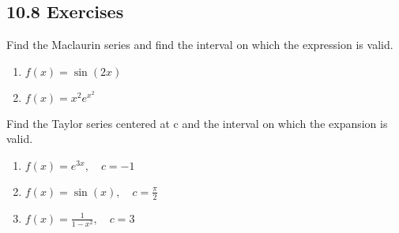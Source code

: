 \subsection{10.8 Exercises}

Find the Maclaurin series and find the interval on which the expression is
valid.
\begin{enumerate}[itemsep=24em]
  \item \(\displaystyle  f(x) = \sin(2x) \)
  \item \(\displaystyle  f(x) = x^2e^{x^{2} } \)
\end{enumerate}

\newpage %

Find the Taylor series centered at c and the interval on which the expansion is
valid.
\begin{enumerate}[itemsep=18em, resume]
  \item \(\displaystyle  f(x) = e^{3x}, \quad c = -1 \)
  \item \(\displaystyle  f(x) = \sin(x), \quad c = \frac{\pi}{2} \)
  \item \(\displaystyle  f(x) = \frac{1}{1-x^2}, \quad c = 3\)
\end{enumerate}


